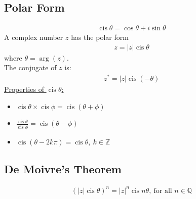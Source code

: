 \documentclass[10pt, a4paper, titlepage]{article}
\DeclareMathOperator\cis{cis}
\begin{document}
\begin{multicols*}{3}
	\subsection{Polar Form}
	\begin{align}
		\cis{\theta}=\cos{\theta}+i\sin{\theta}
	\end{align}
	A complex number $z$ has the polar form
	\begin{align}
		z=|z|\cis{\theta}
	\end{align}
	where $\theta = \arg({z})$.\\
	The conjugate of $z$ is:
	\begin{align}
		z^*=|z|\cis{(-\theta)}
	\end{align}
	\underline{Properties of $\cis{\theta}$:}
	\begin{itemize}
		\item $\cis{\theta}\times \cis{\phi}=\cis{(\theta +\phi )}$
		\item $\frac{\cis{\theta}}{\cis{\phi}}=\cis{(\theta -\phi )}$
		\item $\cis{(\theta -2k\pi )}=\cis{\theta},\ k\in \mathbb{Z}$
	\end{itemize}


	\dotfill
	\subsection{De Moivre's Theorem}
	\begin{align}
		(|z|\cis{\theta})^n=|z|^n\cis{n\theta},\ \text{for all }n\in \mathbb{Q}
	\end{align}
	\dotfill

\end{multicols*}
\end{document}
